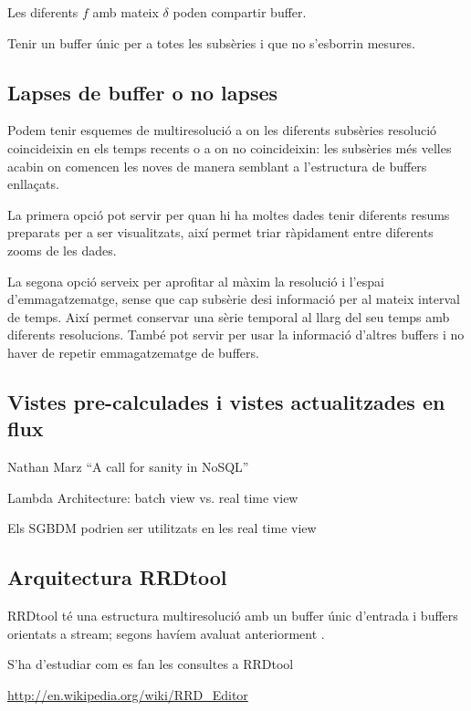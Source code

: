 Les diferents $f$ amb mateix $\delta$ poden compartir buffer.


Tenir un buffer únic per a totes les subsèries i que no s'esborrin mesures.




\subsection{Lapses de buffer o no lapses}

Podem tenir esquemes de multiresolució a on les diferents subsèries
resolució coincideixin en els temps recents o a on no coincideixin:
les subsèries més velles acabin on comencen les noves de manera
semblant a l'estructura de buffers enllaçats.

La primera opció pot servir per quan hi ha moltes dades tenir diferents resums preparats per a ser visualitzats, així permet triar ràpidament entre diferents zooms de les dades.

La segona opció serveix per aprofitar al màxim la resolució i l'espai d'emmagatzematge, sense que cap subsèrie desi informació per al mateix interval de temps. Així permet conservar una sèrie temporal al llarg del seu temps amb diferents resolucions. També pot servir per usar la informació d'altres buffers i no haver de repetir emmagatzematge de buffers.



\subsection{Vistes pre-calculades i vistes actualitzades en flux}

Nathan Marz ``A call for sanity in NoSQL''

Lambda Architecture: batch view vs. real time view

Els SGBDM podrien ser utilitzats en les real time view




\subsection{Arquitectura RRDtool}


RRDtool té una estructura multiresolució amb un buffer únic d'entrada
i buffers orientats a stream; segons havíem avaluat anteriorment \parencite{llusa11:tfm}.


S'ha d'estudiar com es fan les consultes a RRDtool

\url{http://en.wikipedia.org/wiki/RRD_Editor}



